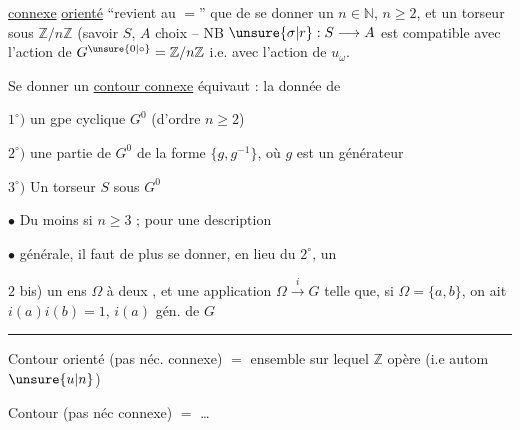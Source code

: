 \uline{connexe} \uline{orienté} ``revient au $=$'' que de se donner un $n\in\mathbb{N}$, $n\geq2$, et un  torseur sous $\mathbb{Z}/n\mathbb{Z}$ (savoir $S$,  $A$  choix -- NB $\unsure{\sigma|r}:S\longrightarrow A$ est compatible avec l'action de $G^{\unsure{0|\circ}}=\mathbb{Z}/n\mathbb{Z}$ i.e. avec l'action de $u_{\omega}$.

Se donner un \uline{contour connexe} équivaut : la donnée de

$1^{\circ})$ un gpe cyclique $G^{0}$ (d'ordre $n\geq2$)

$2^{\circ})$ une  partie de $G^{0}$  de la forme $\{g,g^{-1}\}$, où $g$ est un générateur 

$3^{\circ})$ Un torseur $S$ sous $G^{0}$

$\bullet$ Du moins si $n\geq3$  ; pour une description

$\bullet$ générale, il faut de plus se donner, en lieu du $2^{\circ}$, un

$2$ bis) un ens $\Omega$ à deux , et une application $\Omega\xrightarrow{i}G$ telle que, si $\Omega=\{a,b\}$, on ait $i(a)i(b)=1$, $i(a)$ gén. de $G$

\begin{center}\rule{1cm}{.35pt}\end{center}

Contour orienté (pas néc. connexe) $=$ ensemble sur lequel $\mathbb{Z}$ opère (i.e  autom $\unsure{u|n}$)

Contour (pas néc connexe) $=$ \ldots
